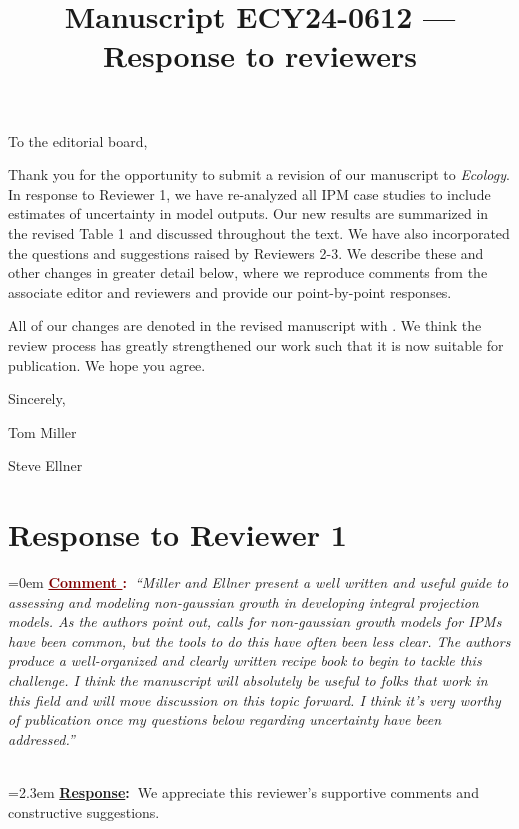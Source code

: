 \documentclass[12pt]{article}
\newcounter{cN}
\newcommand{\comment}[1]{
	\vspace{2em}
	\refstepcounter{cN} %
	\noindent \hangindent=0em \textbf{\textcolor{Maroon}{\uline{Comment \thecN}:~}}\emph{``#1''}
	}
\newcommand{\response}[1]{
	\\[0.25em]
	\hangindent=2.3em \textbf{\textcolor{NavyBlue}{\uline{Response}:~}}#1
	}
\newcommand{\revise}[1]{{\color{Mahogany}{#1}}}
\begin{document}
\title{Manuscript ECY24-0612 --- Response to reviewers}

\maketitle
\noindent To the editorial board,

Thank you for the opportunity to submit a revision of our manuscript to \emph{Ecology}. In response to Reviewer 1, we have re-analyzed all IPM case studies to include estimates of uncertainty in model outputs. Our new results are summarized in the revised Table 1 and discussed throughout the text. We have also incorporated the questions and suggestions raised by Reviewers 2-3. We describe these and other changes in greater detail below, where we reproduce comments from the associate editor and reviewers and provide our point-by-point responses. 

All of our changes are denoted in the revised manuscript with \revise{Mahogany font}. 
We think the review process has greatly strengthened our work such that it is now suitable for publication.
We hope you agree. 

\vspace{2em}
Sincerely,

Tom Miller

Steve Ellner

\newpage

\section{Response to Reviewer 1}
\vspace{-2em}

\comment{Miller and Ellner present a well written and useful guide to assessing and modeling non-gaussian growth in developing integral projection models. As the authors point out, calls for non-gaussian growth models for IPMs have been common, but the tools to do this have often been less clear. The authors produce a well-organized and clearly written recipe book to begin to tackle this challenge. I think the manuscript will absolutely be useful to folks that work in this field and will move discussion on this topic forward. I think it’s very worthy of publication once my questions below regarding uncertainty have been addressed.}
\response{We appreciate this reviewer's supportive comments and constructive suggestions.}
\end{document}
